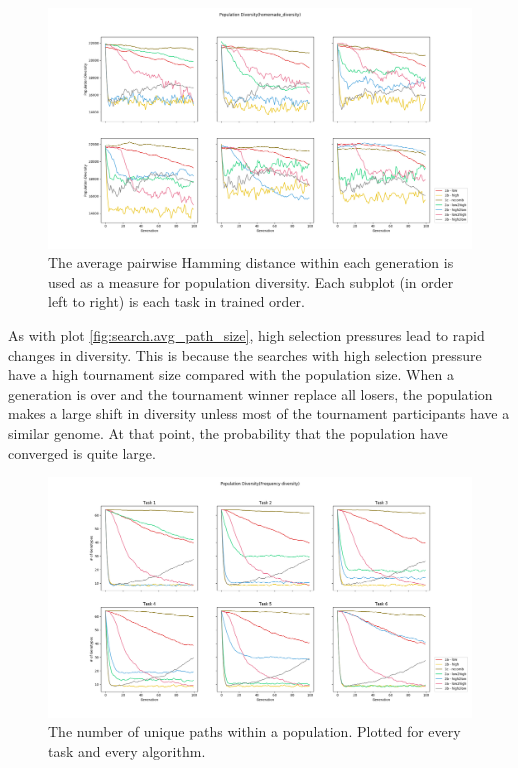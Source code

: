 \begin{figure}[p!]%
    \includegraphics[width=\textwidth]{Chapters/Experiments/search_algo/figures/Average_population_diversity_reduced_hamming.png}
    \caption{The average pairwise Hamming distance within each generation is used as a measure for population diversity. Each subplot (in order left to right) is each task in trained order.}
    \label{fig:search.hamming_diversity}
\end{figure}

As with plot \ref{fig:search.avg_path_size}, high selection pressures lead to rapid changes in diversity. This is because the searches with high selection pressure have a high tournament size compared with the population size. When a generation is over and  the tournament winner replace all losers, the population makes a large shift in diversity unless most of the tournament participants have a similar genome. At that point, the probability that the population have converged is quite large. 

\begin{figure}[p!]%
    \includegraphics[width=\textwidth]{Chapters/Experiments/search_algo/figures/frequency_diversity_unique_path_count.png}
    \caption{The number of unique paths within a population. Plotted for every task and every algorithm.}
    \label{fig:search.frequency_diversity_unique}
\end{figure}

